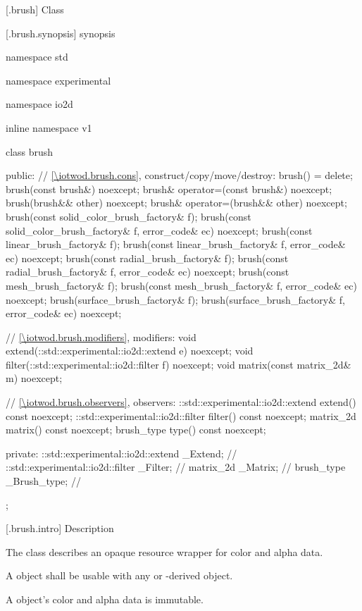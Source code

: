  [\iotwod.brush] {Class }

 [\iotwod.brush.synopsis] { synopsis}

\begin{codeblock}
namespace std { namespace experimental { namespace io2d { inline namespace v1 {
  class brush {
  public:
    // \ref{\iotwod.brush.cons}, construct/copy/move/destroy:
    brush() = delete;
    brush(const brush&) noexcept;
    brush& operator=(const brush&) noexcept;
    brush(brush&& other) noexcept;
    brush& operator=(brush&& other) noexcept;
    brush(const solid_color_brush_factory& f);
    brush(const solid_color_brush_factory& f, error_code& ec) noexcept;
    brush(const linear_brush_factory& f);
    brush(const linear_brush_factory& f, error_code& ec) noexcept;
    brush(const radial_brush_factory& f);
    brush(const radial_brush_factory& f, error_code& ec) noexcept;
    brush(const mesh_brush_factory& f);
    brush(const mesh_brush_factory& f, error_code& ec) noexcept;
    brush(surface_brush_factory& f);
    brush(surface_brush_factory& f, error_code& ec) noexcept;

    // \ref{\iotwod.brush.modifiers}, modifiers:
    void extend(::std::experimental::io2d::extend e) noexcept;
    void filter(::std::experimental::io2d::filter f) noexcept;
    void matrix(const matrix_2d& m) noexcept;

    // \ref{\iotwod.brush.observers}, observers:
    ::std::experimental::io2d::extend extend() const noexcept;
    ::std::experimental::io2d::filter filter() const noexcept;
    matrix_2d matrix() const noexcept;
    brush_type type() const noexcept;

  private:
    ::std::experimental::io2d::extend _Extend; // \expos
    ::std::experimental::io2d::filter _Filter; // \expos
    matrix_2d _Matrix;                         // \expos
    brush_type _Brush_type;                    // \expos
  };
} } } }
\end{codeblock}

 [\iotwod.brush.intro] { Description}

\pnum
{}
The class  describes an opaque resource wrapper for color and alpha data.

\pnum
A  object shall be usable with any  or -derived object.

\pnum
A  object's color and alpha data is immutable.

